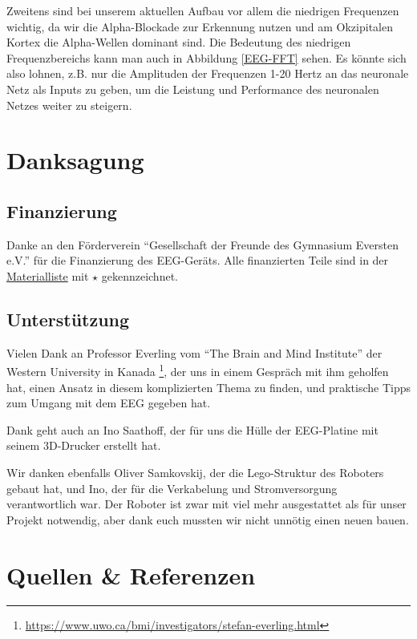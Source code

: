 \documentclass[11pt]{scrartcl}
\begin{document}
	Zweitens sind bei unserem aktuellen Aufbau vor allem die niedrigen Frequenzen wichtig, da wir die Alpha-Blockade zur Erkennung nutzen und am Okzipitalen Kortex die Alpha-Wellen dominant sind. Die Bedeutung des niedrigen Frequenzbereichs kann man auch in Abbildung \ref{EEG-FFT} sehen. Es könnte sich also lohnen, z.B. nur die Amplituden der Frequenzen 1-20 Hertz an das neuronale Netz als Inputs zu geben, um die Leistung und Performance des neuronalen Netzes weiter zu steigern. 

	\newpage

	\section{Danksagung}

	\subsection{Finanzierung} \label{Foerderverein}

	Danke an den Förderverein \enquote{Gesellschaft der Freunde des Gymnasium Eversten e.V.} für die Finanzierung des EEG-Geräts. Alle finanzierten Teile sind in der \hyperref[Materialien]{Materialliste} mit $\star$ gekennzeichnet. 

	\subsection{Unterstützung} \label{Unterstuetzung}

	Vielen Dank an Professor Everling vom \enquote{The Brain and Mind Institute} der Western University in Kanada \footnote{\url{https://www.uwo.ca/bmi/investigators/stefan-everling.html}}, der uns in einem Gespräch mit ihm geholfen hat, einen Ansatz in diesem komplizierten Thema zu finden, und praktische Tipps zum Umgang mit dem EEG gegeben hat.

	Dank geht auch an Ino Saathoff, der für uns die Hülle der EEG-Platine mit seinem 3D-Drucker erstellt hat.

	Wir danken ebenfalls Oliver Samkovskij, der die Lego-Struktur des Roboters gebaut hat, und Ino, der für die Verkabelung und Stromversorgung verantwortlich war. Der Roboter ist zwar mit viel mehr ausgestattet als für unser Projekt notwendig, aber dank euch mussten wir nicht unnötig einen neuen bauen.

	\section{Quellen \& Referenzen}
\end{document}
